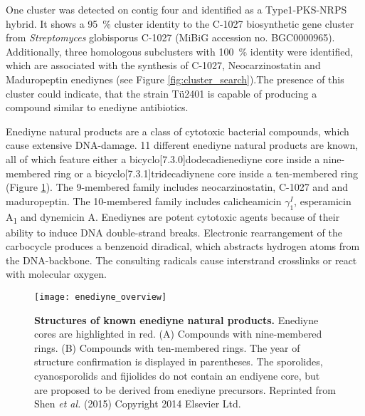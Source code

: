 	 One cluster was detected on contig four and identified as a Type1-PKS-NRPS hybrid. It shows a 95~\% cluster identity to the C-1027 biosynthetic gene cluster from \textit{Streptomyces} globisporus C-1027 (MiBiG accession no. BGC0000965). Additionally, three homologous subclusters with 100~\% identity were identified, which are associated with the synthesis of C-1027, Neocarzinostatin and Maduropeptin enediynes (see Figure \ref{fig:cluster_search}).The presence of this cluster could indicate, that the strain Tü2401 is capable of producing a compound similar to enediyne antibiotics. 
	 
	 Enediyne natural products are a class of cytotoxic bacterial compounds, which cause extensive DNA-damage.\autocite{Liang2010,Gredicak2007,AdrianL.Smith*1996,Nicolaou1993} 11 different enediyne natural products are known, all of which feature either a bicyclo[7.3.0]dodecadienediyne core inside a nine-membered ring or a bicyclo[7.3.1]tridecadiynene core inside a ten-membered ring (Figure \ref{fig:enediyne_comparison}). The 9-membered family includes neocarzinostatin, C-1027 and and maduropeptin. The 10-membered family includes calicheamicin $\gamma_{1}^{I}$, esperamicin A\textsubscript{1} and dynemicin A. \autocite{Liang2010} Enediynes are potent cytotoxic agents because of their ability to induce DNA double-strand breaks.\autocite{Shen2015} Electronic rearrangement of the carbocycle produces a benzenoid diradical, which abstracts hydrogen atoms from the DNA-backbone. The consulting radicals cause interstrand crosslinks or react with molecular oxygen.	 
	 \begin{figure}[htbp]
	 	\centering
	 	\texttt{[image: enediyne\_overview]}
	 	\caption[Structures of known enediyne natural products]{\textbf{Structures of known enediyne natural products.} Enediyne cores are highlighted in red. (A) Compounds with nine-membered rings. (B) Compounds with ten-membered rings. The year of structure confirmation is displayed in parentheses. The sporolides, cyanosporolids and fijiolides do not contain an endiyene core, but are proposed to be derived from enediyne precursors. Reprinted from Shen \textit{et al.} (2015) Copyright 2014 Elsevier Ltd.}
	 	\label{fig:enediyne_comparison}
	 \end{figure}
